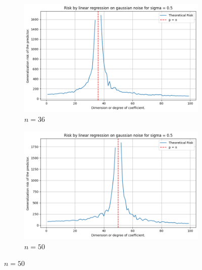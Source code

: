 \documentclass{article}
\begin{document}
\begin{figure}[htb]
  \hfill
  \begin{subfigure}[b]{\imgwidth}
    \includegraphics[width=\linewidth]{img/descent_lin_reg_3.png}
    \caption{$n=36$}\label{fig:1c}
  \end{subfigure}%
  \hfill
  \begin{subfigure}[b]{\imgwidth}
    \includegraphics[width=\linewidth]{img/descent_lin_reg_4.png}
    \caption{$n=50$}\label{fig:1d}
  \end{subfigure}

  \medskip


\end{figure}
\end{document}
